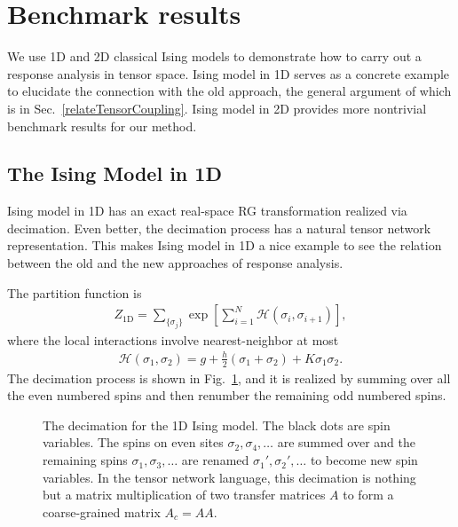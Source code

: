 \documentclass[aps,prb,reprint,superscriptaddress]{revtex4-2}
\begin{document}
\section{Benchmark results\label{benchmark}}
We use 1D and 2D classical Ising models to demonstrate how to carry out
a response analysis in tensor space. Ising model in 1D serves as a
concrete example to elucidate the connection with the old approach, the
general argument of which is in Sec.~\ref{relateTensorCoupling}. Ising
model in 2D provides more nontrivial benchmark results for our method.
%

\subsection{The Ising Model in 1D\label{benchmark:1DIsing}}
Ising model in 1D has an exact real-space RG transformation realized via
decimation. Even better, the decimation process has a natural tensor
network representation. This makes Ising model in 1D a nice example to see
the relation between the old and the new approaches of response
analysis.
%

The partition function is
%
\begin{align}\label{def:Z4Ising1D}
    Z_{\text{1D}} = \sum_{\{\sigma_j \} } \exp{\left[\sum_{i=1}^N
    \mathscr{H}\left(\sigma_i,\sigma_{i+1}\right)  \right]},
\end{align}
%
where the local interactions involve nearest-neighbor at most
%
\begin{align}\label{def:H4Ising1D}
    \mathscr{H}\left(\sigma_1, \sigma_2\right) = g +
    \frac{h}{2}\left(\sigma_1 + \sigma_2\right) + K\sigma_1 \sigma_2.
\end{align}
%
The decimation process is shown in Fig.~\ref{fig:Ising1D-decimation},
and it is realized by summing over all the even numbered spins and then
renumber the remaining odd numbered spins. 
%
\begin{figure}[h]
    \caption{\label{fig:Ising1D-decimation}The decimation for the 1D
    Ising model. The black dots are spin variables. The spins on even
sites $\sigma_2,\sigma_4,\ldots$ are summed over and the remaining spins
$\sigma_1,\sigma_3,\ldots$ are renamed $\sigma_1',\sigma_2',\ldots$ to
become new spin variables. In the tensor network language, this
decimation is nothing but a matrix multiplication of two transfer matrices
$A$ to form a coarse-grained matrix $A_c = AA$.}
\end{figure}
%
\end{document}
